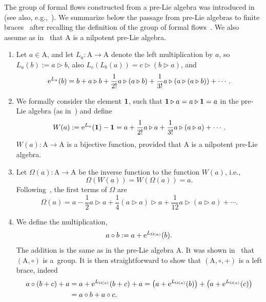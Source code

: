 \documentclass[pdftex]{sigma}
\numberwithin{equation}{section}
\theoremstyle{definition}
\begin{document}
The group of formal flows constructed from a pre-Lie algebra was introduced in~\cite{Chrono} (see also, e.g.,~\cite{Manchon}).
We summarize below the passage from pre-Lie algebras {to finite braces}~\cite{Rump, Smok1, Smok2} after recalling the definition of the
group of formal flows~\cite{Chrono, Manchon}. We also assume as in~\cite{Smok1, Smok2} that ${\mathrm A}$ is a nilpotent pre-Lie algebra.
\begin{enumerate}\itemsep=0pt
\item Let $a\in {\mathrm A}$, and let $L_{a}\colon {\mathrm A}\rightarrow{\mathrm A}$ denote the left multiplication by $a$, so
$L_{a}(b):=a\triangleright b$, also $L_{c}(L_{b}(a))=c\triangleright (b\triangleright a)$,
 and
 \[
 {\rm e}^{L_{a}}(b) =b+a\triangleright b+{\frac 1{2!}}a\triangleright (a\triangleright b)+{\frac 1{3!}}a\triangleright (a\triangleright (a\triangleright b))+\cdots .
 \]

\item We formally consider the element ${\bf 1}$, such that ${\bf 1}\triangleright a=a\triangleright {\bf 1}=a$ in the pre-Lie algebra (as in~\cite{Manchon}) and
define
\[
W(a):={\rm e}^{L_{a}}({\bf 1})-{\bf 1}=a+{\frac 1{2!}}a\triangleright a+{\frac 1{3!}}a\triangleright (a\triangleright a)+ \cdots .
\]
 $W(a)\colon {\mathrm A}\rightarrow {\mathrm A}$ is a bijective function, provided that ${\mathrm A}$ is a nilpotent pre-Lie algebra.

\item Let $\Omega (a)\colon {\mathrm A}\rightarrow {\mathrm A}$ be the inverse function to the function $W(a)$, i.e.,
\[
\Omega (W(a))=W(\Omega (a))=a.
\]
Following~\cite{Manchon}, the first terms of $\Omega $ are
\[
\Omega(a)= a-{\frac 12}a\triangleright a +{\frac 14} (a\triangleright a)\triangleright a +{\frac {1}{12}}a\triangleright(a\triangleright a) +\cdots .
\]

\item We define the multiplication, \[a\circ b:=a+{\rm e}^{L_{\Omega (a)}}(b).\]
The addition is the same as in the pre-Lie algebra ${\mathrm A}$.
It was shown in~\cite{Chrono} that $({\mathrm A}, \circ )$ is a~group. It is then straightforward to show that $({\mathrm A}, \circ , + )$ is a left brace, indeed
 \begin{align*}
 a\circ (b+c)+a&=a+{\rm e}^{L_{\Omega (a)}}(b+c)+a=\bigl(a+{\rm e}^{L_{\Omega (a)}}(b)\bigr)+\bigl(a+{\rm e}^{L_{\Omega (a)}}(c)\bigr)\\
 &=a\circ b+a\circ c.
 \end{align*}
\end{enumerate}
\end{document}
